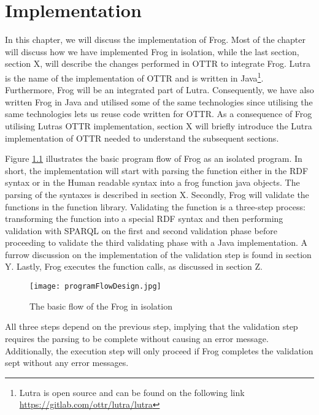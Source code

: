 
\chapter{Implementation}
In this chapter, we will discuss the implementation of Frog. Most of the chapter will discuss how we have implemented Frog in isolation, while the last section, section X, will describe the changes performed in OTTR to integrate Frog. Lutra is the name of the implementation of OTTR and is written in Java\footnote{Lutra is open source and can be found on the following link \url{https://gitlab.com/ottr/lutra/lutra}}. Furthermore, Frog will be an integrated part of Lutra. Consequently, we have also written Frog in Java and utilised some of the same technologies since utilising the same technologies lets us reuse code written for OTTR. As a consequence of Frog utilising Lutras OTTR implementation, section X will briefly introduce the Lutra implementation of OTTR needed to understand the subsequent sections. 

\para
{}
Figure \ref{fig:basic_program_flow} illustrates the basic program flow of Frog as an isolated program. In short, the implementation will start with parsing the function either in the RDF syntax or in the Human readable syntax into a frog function java objects. The parsing of the syntaxes is described in section X. Secondly, Frog will validate the functions in the function library. Validating the function is a three-step process: transforming the function into a special RDF syntax and then performing validation with SPARQL on the first and second validation phase before proceeding to validate the third validating phase with a Java implementation. A furrow discussion on the implementation of the validation step is found in section Y. Lastly, Frog executes the function calls, as discussed in section Z.

\begin{figure}
  \centering
  \texttt{[image: programFlowDesign.jpg]}
  \caption{The basic flow of the Frog in isolation}
  \label{fig:basic_program_flow}
\end{figure}
\para
All three steps depend on the previous step, implying that the validation step requires the parsing to be complete without causing an error message. Additionally, the execution step will only proceed if Frog completes the validation sept without any error messages.  

